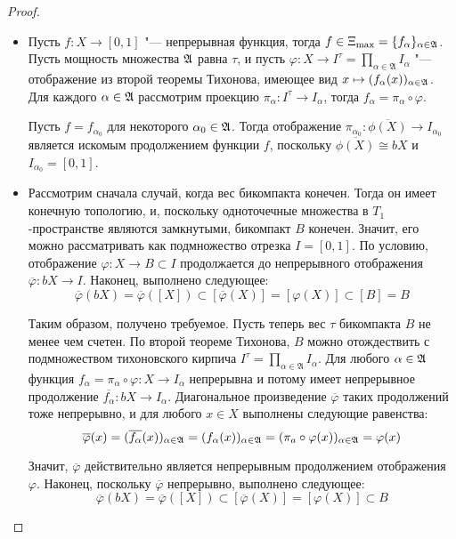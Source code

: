 \begin{proof}~
    \begin{itemize}
        \item{}Пусть $f: X\rightarrow [0, 1]$ "--- непрерывная функция, тогда $f \in \Xi_{\max} = \{f_{\alpha}\}_{\alpha \in \mathfrak A}$. Пусть мощность множества $\mathfrak A$ равна $\tau$, и пусть $\varphi: X \rightarrow I^{\tau} = \prod_{\alpha \in \mathfrak{A}}I_\alpha$ "--- отображение из второй теоремы Тихонова, имеющее вид $x \mapsto (f_\alpha(x))_{\alpha \in \mathfrak A}$. Для каждого $\alpha \in \mathfrak A$ рассмотрим проекцию $\pi_\alpha : I^\tau \to I_\alpha$, тогда $f_\alpha = \pi_\alpha \circ \varphi$.
        
        Пусть $f = f_{\alpha_0}$ для некоторого $\alpha_0 \in \mathfrak A$. Тогда отображение $\pi_{\alpha_0}: \overline{\phi(X)} \to I_{\alpha_0}$ является искомым продолжением функции $f$, поскольку $\overline{\phi(X)} \cong bX$ и $I_{\alpha_0} = [0, 1]$.

        \item{}Рассмотрим сначала случай, когда вес бикомпакта конечен. Тогда он имеет конечную топологию, и, поскольку одноточечные множества в $T_1$-пространстве являются замкнутыми, бикомпакт $B$ конечен. Значит, его можно рассматривать как подмножество отрезка $I = [0, 1]$. По условию, отображение $\varphi: X \rightarrow B \subset I$ продолжается до непрерывного отображения $\overline{\varphi}: bX \rightarrow I$. Наконец, выполнено следующее:
        \[\overline{\varphi}(bX) = \overline{\varphi}([X]) \subset [\overline{\varphi} (X)] = [\varphi(X)] \subset [B] = B\]

        Таким образом, получено требуемое. Пусть теперь вес $\tau$ бикомпакта $B$ не менее чем счетен. По второй теореме Тихонова, $B$ можно отождествить с подмножеством тихоновского кирпича $I^{\tau} = \prod_{\alpha \in \mathfrak{A}}I_\alpha$. Для любого $\alpha \in \mathfrak A$ функция $f_{\alpha} = \pi_\alpha \circ \varphi: X\rightarrow I_\alpha$ непрерывна и потому имеет непрерывное продолжение $\overline{f_\alpha}: bX \rightarrow I_\alpha$. Диагональное произведение $\overline{\varphi}$ таких продолжений тоже непрерывно, и для любого $x \in X$ выполнены следующие равенства:
        \[\overline{\varphi}(x) = (\overline{f_\alpha}(x))_{\alpha \in \mathfrak A} = (f_\alpha(x))_{\alpha \in \mathfrak A} = (\pi_a\circ\varphi(x))_{\alpha \in \mathfrak A} = \varphi(x)\]

        Значит, $\overline{\varphi}$ действительно является непрерывным продолжением отображения $\varphi$. Наконец, поскольку $\overline{\varphi}$ непрерывно, выполнено следующее:
        \[\overline{\varphi}(bX) = \overline{\varphi}([X]) \subset [\overline{\varphi}(X)] = [\varphi (X)] \subset B\]


\end{itemize}
\end{proof}
